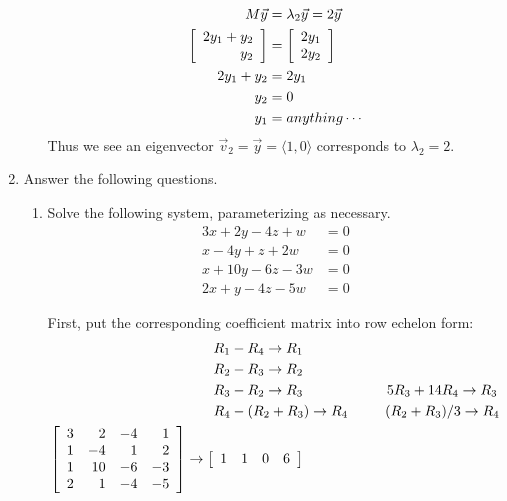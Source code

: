 \documentclass{letter}
\newcounter{question}
\newcommand{\Ve}[1]{\langle #1 \rangle}
\newcommand{\Vn}[1]{\vec{#1}}
\newcommand{\?}{\stackrel{?}{=}}
\newcommand\Que[1]{%
   \leavevmode\noindent
   #1
}
\newcommand\Ans[2][]{%
   \leavevmode\noindent
   {
       \begin{mdframed}[backgroundcolor=blue!10]
       #2
       \end{mdframed}
   }
}
\newenvironment{Mat}[1]{%
  \left[\begin{array}{*{#1}{r}}
}{%
  \end{array}\right]
}
\begin{document}
\begin{enumerate}
\begin{enumerate}[label=(\alph*)]
{        \begin{align*}
            M\Vn{y} &= \lambda_2\Vn{y} = 2\Vn{y}\\
            \begin{Mat}{1} 2y_1 + y_2 \\  y_2 \end{Mat} &= \begin{Mat}{1} 2y_1 \\ 2y_2 \end{Mat} \\
            2y_1 + y_2 &= 2y_1 \\
            y_2 &= 0\\
            y_1 &= anything \cdots
        \end{align*}
        Thus we see an eigenvector $\Vn{v}_2 = \Vn{y} = \Ve{1,0}$ corresponds to $\lambda_2=2$.
    }
    \end{enumerate}
    \newpage
    \item Answer the following questions.
    \begin{enumerate}[label=(\alph*)]
    \item \Que{
        Solve the following system, parameterizing as necessary.
        \begin{align*}
             3x+2y-4z+w &= 0 \\
             x-4y+z+2w  &= 0 \\
             x+10y-6z-3w&= 0 \\
             2x+y-4z-5w &= 0
        \end{align*}
    }
    \Ans{
    First, put the corresponding coefficient matrix into row echelon form:
    \begin{align*}
        &~~~~~~R_1-R_4\to R_1\\
        &~~~~~~R_2-R_3\to R_2\\
        &~~~~~~R_3-R_2\to R_3~~~~~~~~~~~~~~~~~~5R_3+14R_4\to R_3\\
        &~~~~~~R_4-(R_2+R_3)\to R_4~~~~~~~~(R_2+R_3)/3\to R_4\\
        \begin{Mat}{4} 3 &  2 & -4 &  1 \\ 
                       1 & -4 &  1 &  2 \\ 
                       1 & 10 & -6 & -3 \\ 
                       2 &  1 & -4 & -5 \end{Mat}
        &\to
        \begin{Mat}{4} 1 &   1 &  0 &  6 \\

\end{Mat}
\end{align*}}
\end{enumerate}
\end{enumerate}
\end{document}

